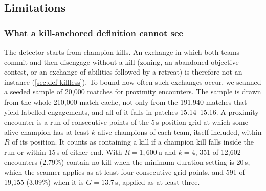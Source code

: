\subsection{Limitations}\label{subsec:limitations}

\subsubsection{What a kill-anchored definition cannot see}

The detector starts from champion kills. An exchange in which both teams commit and then
disengage without a kill (zoning, an abandoned objective contest, or an exchange of abilities
followed by a retreat) is therefore not an instance (\cref{sec:def-killless}). To bound how often
such exchanges occur, we scanned a seeded sample of 20,000 matches for proximity encounters. The
sample is drawn from the whole 210,000-match cache, not only from the 191,940 matches that yield
labelled engagements, and all of it falls in patches 15.14--15.16.
A proximity encounter is a run of consecutive points of the 5\,s position grid at which some alive
champion has at least $k$ alive champions of each team, itself included, within $R$ of its position.
It counts as containing a kill if a champion kill falls inside the run or within 15\,s of either end.
With $R = 1{,}600$\,u and $k = 4$, 351 of 12,602 encounters (2.79\%) contain no kill when the
minimum-duration setting is 20\,s, which the scanner applies as at least four consecutive grid points,
and 591 of 19,155 (3.09\%) when it is $G = 13.7$\,s, applied as at least three.
